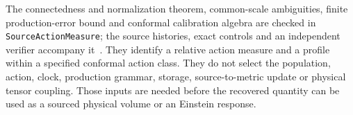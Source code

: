 The connectedness and normalization theorem, common-scale ambiguities,
finite production-error bound and conformal calibration algebra are
checked in \texttt{SourceActionMeasure}; the source histories, exact
controls and an independent verifier accompany it~\cite{ophrepo}. They identify a relative action
measure and a profile within a specified conformal action class. They do
not select the population, action, clock, production grammar, storage,
source-to-metric update or physical tensor coupling. Those inputs are
needed before the recovered quantity can be used as a sourced physical
volume or an Einstein response.
